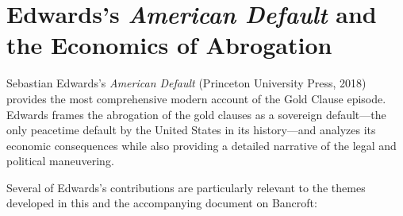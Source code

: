 \documentclass[12pt]{article}
\begin{document}
\section{Edwards's \textit{American Default} and the Economics of
Abrogation}

Sebastian Edwards's \textit{American Default} (Princeton University
Press, 2018) provides the most comprehensive modern account of the Gold
Clause episode. Edwards frames the abrogation of the gold clauses as a
sovereign default---the only peacetime default by the United States in
its history---and analyzes its economic consequences while also
providing a detailed narrative of the legal and political maneuvering.

Several of Edwards's contributions are particularly relevant to the
themes developed in this and the accompanying document on Bancroft:
\end{document}
